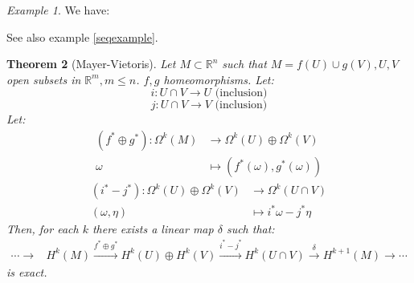 \documentclass[a4paper,11pt,titlepage, article, oneside]{memoir}
\numberwithin{equation}{section}
\newtheorem{theorem}{Theorem}[section]
\theoremstyle{definition}
\theoremstyle{remark}
\newtheorem{example}[theorem]{Example}
\newcommand{\rfield}{\mathbb{R}}
\begin{document}
\begin{tcolorbox}\begin{example}
  We have:
    \begin{center}
\end{center}
See also example \ref{seqexample}.
\end{example}\end{tcolorbox}

\begin{theorem}[Mayer-Vietoris] \label{mvthm}
  Let $M \subset \rfield^n$ such that $M=f(U) \cup g(V), U, V$ open subsets in $\rfield^m, m \le n$. $f, g$ homeomorphisms.
  Let:
  $$i \colon U \cap V \rightarrow U \text{ (inclusion)}$$
  $$j \colon U \cap V \rightarrow V \text{ (inclusion)}$$
  Let:
  \begin{align*}
    (f^* \oplus g^*) \colon \Omega^k(M) &\rightarrow \Omega^k(U) \oplus \Omega^k(V) \\
    \omega &\mapsto (f^*(\omega), g^*(\omega))
  \end{align*}
  \begin{align*}
    (i^* - j^*) \colon \Omega^k(U) \oplus \Omega^k(V) &\rightarrow \Omega^k(U \cap V)\\
    (\omega, \eta) &\mapsto i^* \omega - j^* \eta
  \end{align*}
  Then, for each $k$ there exists a linear map $\delta$ such that:
  \begin{align*}
    \cdots \longrightarrow &H^k(M) \overset{f^* \oplus g^*}{\longrightarrow} H^k(U) \oplus H^k(V) \overset{i^* - j^*}{\longrightarrow} H^k(U \cap V) \overset{\delta}{\longrightarrow} H^{k+1}(M) \longrightarrow \cdots
  \end{align*}
  is exact.
\end{theorem}
\end{document}

